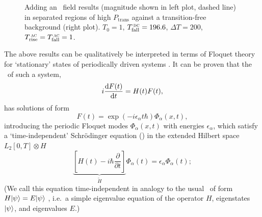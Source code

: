 \begin{figure}
    \makebox[\textwidth][c]{%
        \small
        \begin{minipage}[c]{\textwidth}
            \def\svgwidth{\textwidth}
            
        \end{minipage}
    }
    \caption[Transition frequency with \AC\ field.]{Adding an \AC\ field results
    (magnitude shown in left plot, dashed line) in separated regions of high
    $P_\text{trans}$ against a transition-free background (right plot). $T_0=1$,
    $T_\text{fall}^\text{\,\textsc{dc}}=196.6$, $\Delta T=200$,
    $T_\text{rise}^\text{\,\textsc{ac}}=T_\text{fall}^\text{\,\textsc{ac}}=1$.}
    \label{floquet2}
\end{figure}

The above results can be qualitatively be interpreted in terms of Floquet theory
for `stationary' states of periodically driven systems
\cite[ch.~5]{dittrich1998quantum}. It can be proven that the \TDSE\ of such a
system,
%
\[
    i\frac{\mathrm{d} F(t)}{\mathrm{d} t}=H(t) F(t),
\]
%
has solutions of form \cite[sect.~II.A]{shirley1965solution}
%
\[
    F(t)=\exp(-i\epsilon_\alpha t\hbar)\Phi_\alpha(x,t),
\]
%
introducing the periodic Floquet modes $\Phi_\alpha(x,t)$ with energies
$\epsilon_\alpha$, which satisfy a `time-independent' Schr\"odinger equation
(\TISE) in the extended Hilbert space $L_2[0,T]\otimes H$
%
\[
\underbrace{\left[H(t)-i\hbar\frac{\partial}{\partial
t}\right]}_{\widetilde{H}}\Phi_\alpha(t)=\epsilon_\alpha\Phi_\alpha(t);
\]
%
(We call this equation time-independent in analogy to the usual \TISE\ of form
$H|\psi\rangle=E|\psi\rangle$ \cite[eqn~2.33]{binney2013physics}, i.e.\ a simple
eigenvalue equation of the operator $H$, eigenstates $|\psi\rangle$, and
eigenvalues $E$.)


